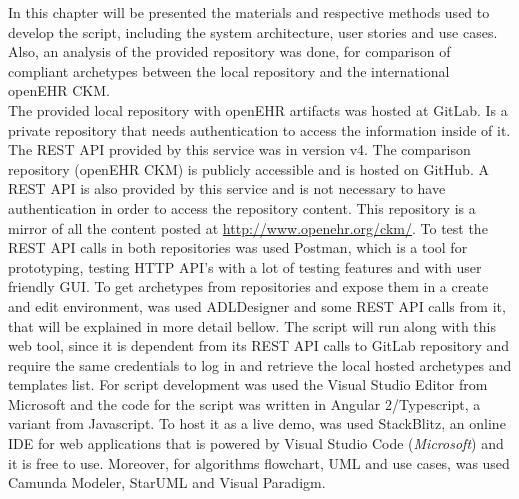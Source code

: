 \documentclass[mim_thesis.tex]{subfiles}
\begin{document}
In this chapter will be presented the materials and respective methods used to develop the script, including the system architecture, user stories and use cases. Also, an analysis of the provided repository was done, for comparison of compliant archetypes between the local repository and the international openEHR CKM.\\

The provided local repository with openEHR artifacts was hosted at GitLab. Is a private repository that needs authentication to access the information inside of it. The REST API provided by this service was in version v4. The comparison repository (openEHR CKM) is publicly accessible and is hosted on GitHub. A REST API is also provided by this service and is not necessary to have authentication in order to access the repository content. This repository is a mirror of all the content posted at \url{http://www.openehr.org/ckm/}. To test the REST API calls in both repositories was used Postman, which is a tool for prototyping, testing HTTP API's with a lot of testing features and with user friendly GUI. To get archetypes from repositories and expose them in a create and edit environment, was used ADLDesigner and some REST API calls from it, that will be explained in more detail bellow. The script will run along with this web tool, since it is dependent from its REST API calls to GitLab repository and require the same credentials to log in and retrieve the local hosted archetypes and templates list. For script development was used the Visual Studio Editor from Microsoft and the code for the script was written in Angular 2/Typescript, a variant from Javascript. To host it as a live demo, was used StackBlitz, an online IDE for web applications that is powered by Visual Studio Code (\textit{Microsoft}) and it is free to use. Moreover, for algorithms flowchart, UML and use cases, was used Camunda Modeler, StarUML and Visual Paradigm. \\
\end{document}

